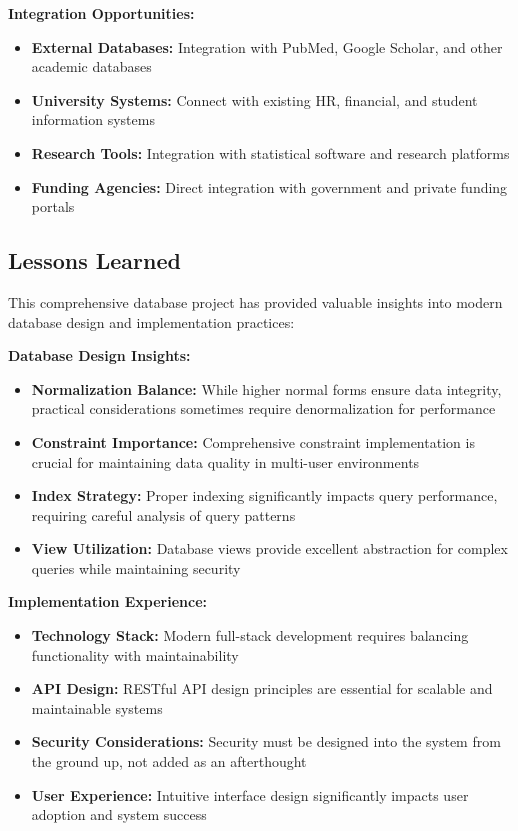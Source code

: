 \documentclass[12pt,a4paper]{article}
\begin{document}
\textbf{Integration Opportunities:}
\begin{itemize}
    \item \textbf{External Databases:} Integration with PubMed, Google Scholar, and other academic databases
    \item \textbf{University Systems:} Connect with existing HR, financial, and student information systems
    \item \textbf{Research Tools:} Integration with statistical software and research platforms
    \item \textbf{Funding Agencies:} Direct integration with government and private funding portals
\end{itemize}

\subsection{Lessons Learned}
This comprehensive database project has provided valuable insights into modern database design and implementation practices:

\textbf{Database Design Insights:}
\begin{itemize}
    \item \textbf{Normalization Balance:} While higher normal forms ensure data integrity, practical considerations sometimes require denormalization for performance
    \item \textbf{Constraint Importance:} Comprehensive constraint implementation is crucial for maintaining data quality in multi-user environments
    \item \textbf{Index Strategy:} Proper indexing significantly impacts query performance, requiring careful analysis of query patterns
    \item \textbf{View Utilization:} Database views provide excellent abstraction for complex queries while maintaining security
\end{itemize}

\textbf{Implementation Experience:}
\begin{itemize}
    \item \textbf{Technology Stack:} Modern full-stack development requires balancing functionality with maintainability
    \item \textbf{API Design:} RESTful API design principles are essential for scalable and maintainable systems
    \item \textbf{Security Considerations:} Security must be designed into the system from the ground up, not added as an afterthought
    \item \textbf{User Experience:} Intuitive interface design significantly impacts user adoption and system success
\end{itemize}
\end{document}

